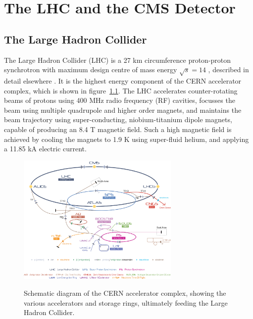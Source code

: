 \chapter{The LHC and the CMS Detector}

\ifpdf
    \graphicspath{{Chapter3/Figs/Raster/}{Chapter3/Figs/PDF/}{Chapter3/Figs/}}
\else
    \graphicspath{{Chapter3/Figs/Vector/}{Chapter3/Figs/}}
\fi


\section{The Large Hadron Collider}  %
\label{sec:detector_lhc}

The Large Hadron Collider (LHC) is a 27 km circumference proton-proton 
synchrotron with maximum design centre of mass energy
$\sqrt{s} = 14$ \tev, described in detail elsewhere \cite{Evans:2008zzb}. It
is the highest energy component of the CERN accelerator
complex, which is shown in figure~\ref{fig:cern_acc_complex}. The LHC
accelerates counter-rotating beams of protons using 400 MHz radio frequency
(RF) cavities, focusses the beam using multiple quadrupole and higher order magnets,
and maintains the beam trajectory using super-conducting, niobium-titanium 
dipole magnets, capable of producing an 8.4 T magnetic field. Such a high 
magnetic field is achieved by cooling the magnets to 1.9 K using super-fluid 
helium, and applying a 11.85 kA electric current.

\begin{figure}[hb!]
\centering
\includegraphics[width=0.7\textwidth]{Figs/machine/Cern-Accelerator-Complex.jpg}
\label{fig:cern_acc_complex}
\caption{Schematic diagram of the CERN accelerator complex, showing the various 
accelerators and storage rings, ultimately feeding the Large Hadron Collider.}
\end{figure}

